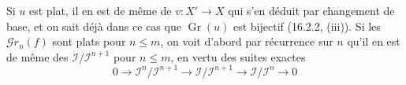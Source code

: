 Si $u$ est plat, il en est de même de $v:X'\to X$ qui s'en déduit par
changement de base, et on sait déjà dans ce cas que $\operatorname{Gr}(u)$ est
bijectif (16.2.2, (iii)). Si les $\mathscr{G}r_n(f)$ sont plats pour
$n\leq m$, on voit d'abord par récurrence sur $n$ qu'il en est de même des
$\mathscr{I}/\mathscr{I}^{n+1}$ pour $n\leq m$, en vertu des suites exactes
\[
  0\longrightarrow\mathscr{I}^n/\mathscr{I}^{n+1}
  \longrightarrow\mathscr{I}/\mathscr{I}^{n+1}
  \longrightarrow\mathscr{I}/\mathscr{I}^n
  \longrightarrow 0
\]
